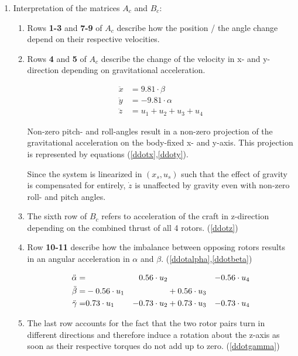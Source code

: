 \documentclass[11pt]{article}
\begin{document}
\begin{enumerate}
    \item Interpretation of the matrices $A_c$ and $B_c$:
    
    \begin{enumerate}
    \item
    Rows \textbf{1-3} and \textbf{7-9} of $A_c$ describe how the position / the angle change depend on their respective velocities.
        
    \item Rows \textbf{4} and \textbf{5} of $A_c$ describe the change of the velocity in x- and y-direction depending on gravitational acceleration.
    
    \begin{align}
    \ddot{x}&=9.81\cdot\beta \label{ddotx} \\
    \ddot{y}&=-9.81\cdot\alpha \label{ddoty} \\
    \ddot{z}&=u_1+u_2+u_3+u_4 \label{ddotz}
    \end{align}
    
	Non-zero pitch- and roll-angles result in a non-zero projection of the gravitational acceleration on the body-fixed x- and y-axis. This projection is represented by equations (\ref{ddotx},\ref{ddoty}).
	
Since the system is linearized in $(x_s,u_s)$ such that the effect of gravity is compensated for entirely, $\dot{z}$ is unaffected by gravity even with non-zero roll- and pitch angles.
	\item 
	The sixth row of $B_c$ refers to acceleration of the craft in z-direction depending on the combined thrust of all 4 rotors. (\ref{ddotz})
	\item Row \textbf{10-11} describe how the imbalance between opposing rotors results in an angular acceleration in $\alpha$ and $\beta$. (\ref{ddotalpha},\ref{ddotbeta})
	
	\begin{alignat}{6}
	\ddot{\alpha}=& & 0.56\cdot u_2 &\null &-0.56\cdot u_4 \label{ddotalpha} \\
	\ddot{\beta} = & -0.56\cdot u_1 &&+0.56\cdot u_3 &\label{ddotbeta} \\
	\ddot{\gamma}= & 0.73\cdot u_1&-0.73\cdot u_2&+0.73\cdot u_3&-0.73\cdot u_4 \label{ddotgamma}
	\end{alignat}
	
	\item The last row accounts for the fact that the two rotor pairs turn in different directions and therefore induce a rotation about the z-axis as soon as their respective torques do not add up to zero. (\ref{ddotgamma})
    \end{enumerate}
\end{enumerate}
\end{document}
